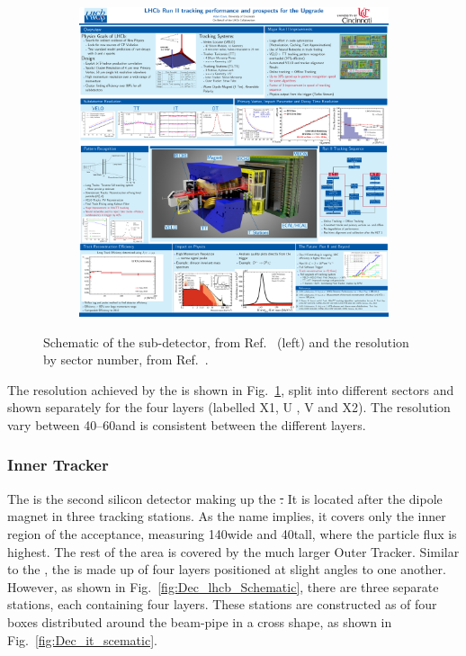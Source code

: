 \begin{figure}[!h]
\begin{subfigure}[m]{0.49\textwidth}
        \includegraphics[width=1.0\textwidth]{figs/Detector/tt_resolution.pdf}
    \end{subfigure}
    \caption{Schematic of the \ttracker sub-detector, from Ref.~\cite{Alves:2008zz} (left) and the \ttracker resolution by sector number, from Ref.~\cite{LHCb-DP-2014-002}.}
    \label{fig:Dec_tt_scematic}   
\end{figure}


The resolution achieved by the \ttracker is shown in Fig.~\ref{fig:Dec_tt_scematic}, split into different sectors and shown separately for the four layers (labelled X1, U , V and X2). The resolution vary between 40--60\mum and is consistent between the different layers. 


\subsubsection{Inner Tracker}

The \intr is the second silicon detector making up the \st. It is located after the dipole magnet in three tracking stations. As the name implies, it covers only the inner region of the acceptance, measuring 140\cm wide and 40\cm tall, where the particle flux is highest. The rest of the area is covered by the much larger Outer Tracker. Similar to the \ttracker, the \intr is made up of four layers positioned at slight angles to one another. However, as shown in Fig.~\ref{fig:Dec_lhcb_Schematic}, there are three separate \intr stations, each containing four layers.
These stations are constructed as of four boxes distributed around the beam-pipe in a cross shape, as shown in Fig.~\ref{fig:Dec_it_scematic}. 



